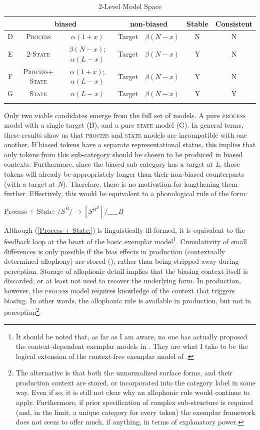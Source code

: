\begin{table}[h]\footnotesize
\caption{2-Level Model Space\label{tab: Model Comparison}}
\begin{tabular}{ccccccc}
\lsptoprule
 & \multicolumn{2}{c}{biased} & \multicolumn{2}{c}{non-biased} & Stable & Consistent\tabularnewline\midrule
D & \textsc{Process} & $\alpha(1+x)$ & Target & $\beta(N-x)$ & N & N\tabularnewline
E & \textsc{2-State} & $\beta(N-x)$; $\alpha(L-x)$ & Target & $\beta(N-x)$ & Y & N\tabularnewline
F & \textsc{Process+ State} & $\alpha(1+x)$; $\alpha(L-x)$ & Target & $\beta(N-x)$ & Y & N\tabularnewline
G & \textsc{State} & $\alpha(L-x)$ & Target & $\beta(N-x)$ & Y & Y\tabularnewline
\lspbottomrule
\end{tabular}
\end{table}

Only two viable candidates emerge from the full set of models. A pure
\textsc{process} model with a single target (B), and a pure \textsc{state}
model (G). In general terms, these results show us that \textsc{process}
and \textsc{state} models are incompatible with one another. If biased
tokens have a separate representational status, this implies that
only tokens from this sub-category should be chosen to be produced
in biased contexts. Furthermore, since the biased sub-category has
a target at \emph{L}, those tokens will already be appropriately longer
than their non-biased counterparts (with a target at \emph{N}). Therefore,
there is no motivation for lengthening them further. Effectively,
this would be equivalent to a phonological rule of the form:
\begin{covexamples}
\item \label{Process-+-State:}Process + State: $/S^{B}/\rightarrow[S{}^{B^{B}}]/$\emph{\_\_B}
\end{covexamples}
Although (\ref{Process-+-State:}) is linguistically ill-formed, it
is equivalent to the feedback loop at the heart of the basic exemplar
model\footnote{It should be noted that, as far as I am aware, no one has actually
proposed the context-dependent exemplar models in .
They are what I take to be the logical extension of the context-free
exemplar model of \citet{Pierrehumbert2000}.}. Cumulativity of small differences is only possible if the bias effects
in production (contextually determined allophony) are stored (),
rather than being stripped away during perception. Storage of allophonic
detail implies that the biasing context itself is discarded, or at
least not used to recover the underlying form. In production, however,
the \textsc{process} model requires knowledge of the context that
triggers biasing. In other words, the allophonic rule is available
in production, but not in perception\footnote{The alternative is that both the unnormalized surface forms, and their
production context are stored, or incorporated into the category label
in some way. Even if so, it is still not clear why an allophonic rule
would continue to apply. Furthermore, if prior specification of complex
sub-structure is required (and, in the limit, a unique category for
every token) the exemplar framework does not seem to offer much, if
anything, in terms of explanatory power. }. 

